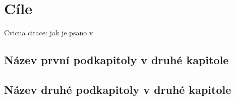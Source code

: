 \chapter{Cíle}

Cvicna citace: jak je psano v~\citet{Lamport1994}

\section{Název první podkapitoly v druhé kapitole}

\section{Název druhé podkapitoly v druhé kapitole}


